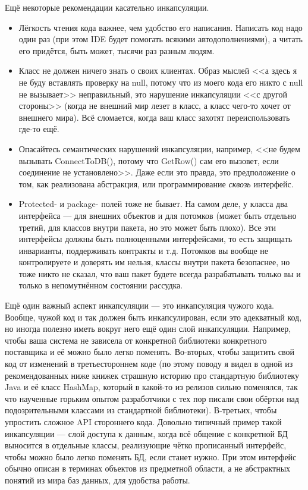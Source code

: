 \documentclass[a5paper]{article}
\begin{document}
Ещё некоторые рекомендации касательно инкапсуляции.

\begin{itemize}
    \item Лёгкость чтения кода важнее, чем удобство его написания. Написать код надо один раз (при этом IDE будет помогать всякими автодополнениями), а читать его придётся, быть может, тысячи раз разным людям.
    \item Класс не должен ничего знать о своих клиентах. Образ мыслей <<а здесь я не буду вставлять проверку на null, потому что из моего кода его никто с null не вызывает>> неправильный, это нарушение инкапсуляции <<с другой стороны>> (когда не внешний мир лезет в класс, а класс чего-то хочет от внешнего мира). Всё сломается, когда ваш класс захотят переиспользовать где-то ещё.
    \item Опасайтесь семантических нарушений инкапсуляции, например, <<не будем вызывать ConnectToDB(), потому что GetRow() сам его вызовет, если соединение не установлено>>. Даже если это правда, это предположение о том, как реализована абстракция, или программирование \textit{сквозь} интерфейс.
    \item Protected- и package- полей тоже не бывает. На самом деле, у класса два интерфейса --- для внешних объектов и для потомков (может быть отдельно третий, для классов внутри пакета, но это может быть плохо). Все эти интерфейсы должны быть полноценными интерфейсами, то есть защищать инварианты, поддерживать контракты и т.д. Потомков вы вообще не контролируете и доверять им нельзя, классы внутри пакета безопаснее, но тоже никто не сказал, что ваш пакет будете всегда разрабатывать только вы и только в непомутнённом состоянии рассудка.
\end{itemize}

Ещё один важный аспект инкапсуляции --- это инкапсуляция чужого кода. Вообще, чужой код и так должен быть инкапсулирован, если это адекватный код, но иногда полезно иметь вокруг него ещё один слой инкапсуляции. Например, чтобы ваша система не зависела от конкретной библиотеки конкретного поставщика и её можно было легко поменять. Во-вторых, чтобы защитить свой код от изменений в третьестороннем коде (по этому поводу я видел в одной из рекомендованных ниже книжек страшную историю про стандартную библиотеку Java и её класс HashMap, который в какой-то из релизов сильно поменялся, так что наученные горьким опытом разработчики с тех пор писали свои обёртки над подозрительными классами из стандартной библиотеки). В-третьих, чтобы упростить сложное API стороннего кода. Довольно типичный пример такой инкапсуляции --- слой доступа к данным, когда всё общение с конкретной БД выносится в отдельные классы, реализующие чётко прописанный интерфейс, чтобы можно было легко поменять БД, если станет нужно. При этом интерфейс обычно описан в терминах объектов из предметной области, а не абстрактных понятий из мира баз данных, для удобства работы.
\end{document}
